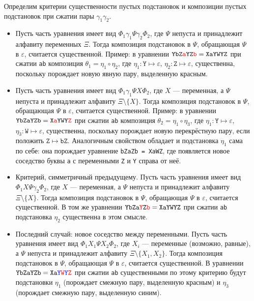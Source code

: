 \documentclass[12pt]{article}
\begin{document}
Определим критерии существенности пустых подстановок и композиции пустых подстановок при сжатии пары $\gamma_1 \gamma_2$.
\begin{itemize}
\item Пусть часть уравнения имеет вид $\Phi_1\gamma_1\Psi\gamma_2\Phi_2$, где $\Psi$ непуста и принадлежит алфавиту переменных $\Xi$. Тогда композиция подстановок в $\Psi$, обращающая $\Psi$ в $\varepsilon$, считается существенной. Пример: в уравнении $\mathtt{YbZ\textcolor{red}{a}YZ\textcolor{red}{b} = XaYWYZ}$ при сжатии \verb|ab| композиция $\theta_1 = \eta_1\circ\eta_2$, где $\eta_1: \mathtt{Y}\mapsto\varepsilon$, $\eta_2: \mathtt{Z}\mapsto\varepsilon$, существенна, поскольку порождает новую явную пару, выделенную красным.
\item Пусть часть уравнения имеет вид $\Phi_1\gamma_1\Psi X\Phi_2$, где $X$ --- переменная, а $\Psi$ непуста и принадлежит алфавиту $\Xi\setminus\{X\}$. Тогда композиция подстановок в $\Psi$, обращающая $\Psi$ в $\varepsilon$, считается существенной. Пример: в уравнении $\mathtt{YbZ{a}YZ{b} = X\textcolor{red}{a}YWY\textcolor{red}{Z}}$ при сжатии \verb|ab| композиция $\theta_2 = \eta_1\circ\eta_3$, где $\eta_1: \mathtt{Y}\mapsto\varepsilon$, $\eta_3: \mathtt{W}\mapsto\varepsilon$, существенна, поскольку порождает новую перекрёстную пару, если положить $\mathtt{Z}\mapsto\mathtt{bZ}$. Аналогичным свойством обладает и подстановка $\eta_1$ сама по себе: она порождает уравнение \verb|bZaZb = XaWZ|, где появляется новое соседство буквы \verb|a| с переменными \verb|Z| и \verb|Y| справа от неё.
\item Критерий, симметричный предыдущему. Пусть часть уравнения имеет вид $\Phi_1 X\Psi \gamma_2\Phi_2$, где $X$ --- переменная, а $\Psi$ непуста и принадлежит алфавиту $\Xi\setminus\{X\}$. Тогда композиция подстановок в $\Psi$, обращающая $\Psi$ в $\varepsilon$, считается существенной. В том же уравнении $\mathtt{YbZ{a}\textcolor{red}{Y}Z\textcolor{red}{b} = X{a}YWY{Z}}$ при сжатии \verb|ab| подстановка $\eta_2$ существенна в этом смысле.
\item Последний случай: новое соседство между переменными. Пусть часть уравнения имеет вид $\Phi_1 X_1\Psi X_2\Phi_2$, где $X_i$ --- переменные (возможно, равные), а $\Psi$ непуста и принадлежит алфавиту $\Xi\setminus\{X_1,X_2\}$. Тогда композиция подстановок в $\Psi$, обращающая $\Psi$ в $\varepsilon$, считается существенной. В уравнении $\mathtt{YbZ{a}{Y}Z{b} = X{a}\textcolor{blue}{Y}\textcolor{red}{W}\textcolor{blue}{Y}\textcolor{red}{Z}}$ при сжатии \verb|ab| существенными по этому критерию будут подстановки $\eta_1$ (порождает смежную пару, выделенную красным) и $\eta_3$ (порождает смежную пару, выделенную синим).

\end{itemize}
\end{document}
